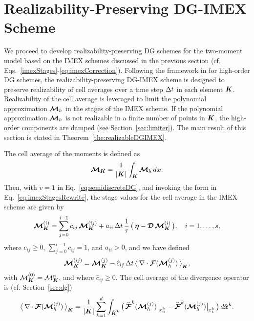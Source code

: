 \section{Realizability-Preserving DG-IMEX Scheme}
\label{sec:realizableDGIMEX}

We proceed to develop realizability-preserving DG schemes for the two-moment model based on the IMEX schemes discussed in the previous section (cf. Eqs.~\eqref{imexStages}-\eqref{eq:imexCorrection}).  
Following the framework in \cite{zhangShu_2010b} for high-order DG schemes, the realizability-preserving DG-IMEX scheme is designed to preserve realizability of cell averages over a time step $\Delta t$ in each element $\boldsymbol{K}$.  
Realizability of the cell average is leveraged to limit the polynomial approximation $\boldsymbol{\mathcal{M}}_{h}$ in the stages of the IMEX scheme.  
If the polynomial approximation $\boldsymbol{\mathcal{M}}_{h}$ is not realizable in a finite number of points in $\boldsymbol{K}$, the high-order components are damped (see Section~\ref{sec:limiter}).  
The main result of this section is stated in Theorem~\ref{the:realizableDGIMEX}.  

The cell average of the moments is defined as
\begin{equation}
  \boldsymbol{\mathcal{M}}_{\boldsymbol{K}}
  =\frac{1}{|\boldsymbol{K}|}\int_{\boldsymbol{K}}\boldsymbol{\mathcal{M}}_{h}\,d\boldsymbol{x}.  
\end{equation}
Then, with $v=1$ in Eq.~\eqref{eq:semidiscreteDG}, and invoking the form in Eq.~\eqref{eq:imexStagesRewrite}, the stage values for the cell average in the IMEX scheme are given by
\begin{equation}
  \boldsymbol{\mathcal{M}}_{\boldsymbol{K}}^{(i)}
  =\sum_{j=0}^{i-1}c_{ij}\,\boldsymbol{\mathcal{M}}_{\boldsymbol{K}}^{(ij)}
  +a_{ii}\,\Delta t\,\frac{1}{\tau}\,\big(\,\boldsymbol{\eta}-\boldsymbol{\mathcal{D}}\,\boldsymbol{\mathcal{M}}_{\boldsymbol{K}}^{(i)}\,\big), \quad i=1,\ldots,s,
  \label{eq:imexStagesCellAverage}
\end{equation}
where $c_{ij}\ge0$, $\sum_{j=0}^{i-1}c_{ij}=1$, and $a_{ii}>0$, and we have defined
\begin{equation}
  \boldsymbol{\mathcal{M}}_{\boldsymbol{K}}^{(ij)}
  =\boldsymbol{\mathcal{M}}_{\boldsymbol{K}}^{(j)}-\hat{c}_{ij}\,\Delta t\,\big\langle\,\nabla\cdot\boldsymbol{\mathcal{F}}(\boldsymbol{\mathcal{M}}_{h}^{(j)})\,\big\rangle_{\boldsymbol{K}},
\end{equation}
with $\mathcal{M}_{\boldsymbol{K}}^{(0)}=\mathcal{M}_{\boldsymbol{K}}^{n}$, and where $\hat{c}_{ij}\ge0$.  
The cell average of the divergence operator is (cf. Section~\ref{sec:dg})
\begin{equation}
  \big\langle\,\nabla\cdot\boldsymbol{\mathcal{F}}(\boldsymbol{\mathcal{M}}_{h}^{(j)})\,\big\rangle_{\boldsymbol{K}}
  =\frac{1}{|\boldsymbol{K}|}\sum_{k=1}^{d}\int_{\tilde{\boldsymbol{K}}^{k}}
  \big(\,\widehat{\boldsymbol{\mathcal{F}}}^{k}(\boldsymbol{\mathcal{M}}_{h}^{(j)})\big|_{x_{\mbox{\tiny H}}^{k}}-\widehat{\boldsymbol{\mathcal{F}}}^{k}(\boldsymbol{\mathcal{M}}_{h}^{(j)})\big|_{x_{\mbox{\tiny L}}^{k}}\,\big)\,d\tilde{\boldsymbol{x}}^{k}.  
\end{equation}

